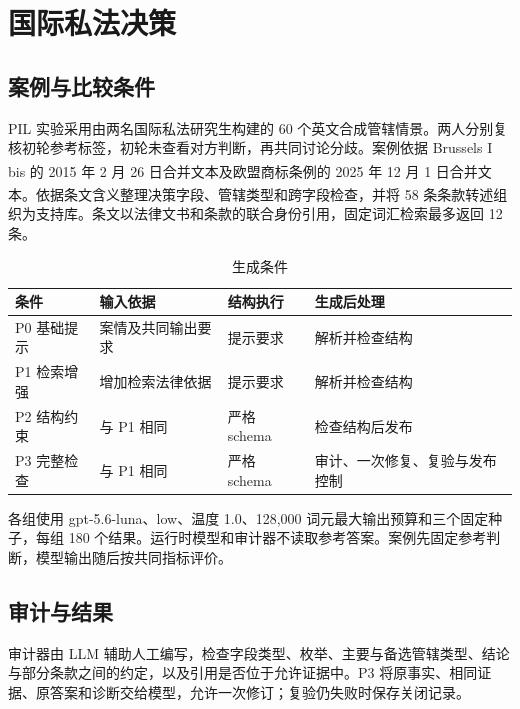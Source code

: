 \documentclass[pdflatex,iicol,sn-mathphys-num]{sn-jnl}
\newcommand{\paperref}[1]{\textsuperscript{\textcolor{citationred}{\citep{#1}}}}
\begin{document}
\FloatBarrier

\setcounter{table}{0}

\section{国际私法决策}\label{app:D}

\subsection{案例与比较条件}\label{app:D-1}

PIL 实验采用由两名国际私法研究生构建的 60 个英文合成管辖情景。两人分别复核初轮参考标签，初轮未查看对方判断，再共同讨论分歧。案例依据 Brussels I bis 的 2015 年 2 月 26 日合并文本\paperref{EU1215_2012_Consolidated20150226}及欧盟商标条例的 2025 年 12 月 1 日合并文本\paperref{EU2017_1001_Consolidated20251201}。依据条文含义整理决策字段、管辖类型和跨字段检查，并将 58 条条款转述组织为支持库。条文以法律文书和条款的联合身份引用，固定词汇检索最多返回 12 条。


\begin{table}[!tbp]
\centering
\caption{生成条件}\label{tab:D1}
\small
\setlength{\tabcolsep}{4pt}
\renewcommand{\arraystretch}{1.20}
\begin{tabularx}{\textwidth}{@{}L L L L@{}}
\toprule
\textbf{条件} & \textbf{输入依据} & \textbf{结构执行} & \textbf{生成后处理} \\
\midrule
P0 基础提示 & 案情及共同输出要求 & 提示要求 & 解析并检查结构 \\
P1 检索增强 & 增加检索法律依据 & 提示要求 & 解析并检查结构 \\
P2 结构约束 & 与 P1 相同 & 严格 schema & 检查结构后发布 \\
P3 完整检查 & 与 P1 相同 & 严格 schema & 审计、一次修复、复验与发布控制 \\
\bottomrule
\end{tabularx}
\end{table}

各组使用 gpt-5.6-luna、low、温度 1.0、128,000 词元最大输出预算和三个固定种子，每组 180 个结果。运行时模型和审计器不读取参考答案。案例先固定参考判断，模型输出随后按共同指标评价。


\subsection{审计与结果}\label{app:D-2}

审计器由 LLM 辅助人工编写，检查字段类型、枚举、主要与备选管辖类型、结论与部分条款之间的约定，以及引用是否位于允许证据中。P3 将原事实、相同证据、原答案和诊断交给模型，允许一次修订；复验仍失败时保存关闭记录。
\end{document}
